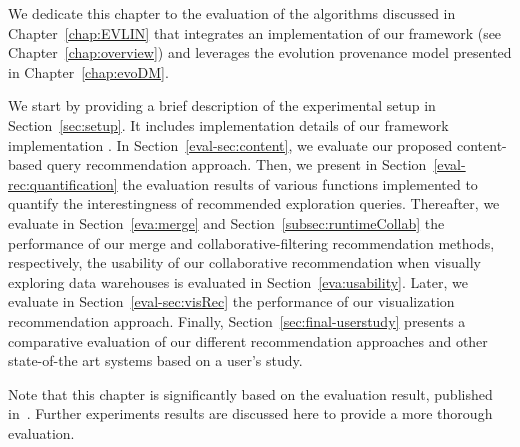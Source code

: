 We dedicate this chapter to the evaluation of the algorithms discussed in Chapter~\ref{chap:EVLIN} that integrates an implementation of our framework (see Chapter~\ref{chap:overview}) and leverages the evolution provenance model presented in Chapter~\ref{chap:evoDM}.


We start by providing a brief description of the experimental setup in Section~\ref{sec:setup}. 
It includes implementation details of our framework implementation \prototype{}.
In Section~\ref{eval-sec:content}, we evaluate our proposed content-based query recommendation approach. Then, we present in Section~\ref{eval-rec:quantification} the evaluation results of various functions implemented to quantify the interestingness of recommended exploration queries. 
Thereafter, we evaluate in Section~\ref{eva:merge} and Section~\ref{subsec:runtimeCollab} the performance of our merge and collaborative-filtering recommendation methods, respectively, the usability of our collaborative recommendation when visually exploring data warehouses  is evaluated in Section~\ref{eva:usability}.
Later, we evaluate in Section~\ref{eval-sec:visRec} the performance of our visualization recommendation approach.
Finally, Section~\ref{sec:final-userstudy} presents a comparative evaluation of our different recommendation approaches and other state-of-the art systems based on a user's study.


Note that this chapter is significantly based on the evaluation result, published in~\cite{Houssem:17:tapp,Houssem:19:adbis,Houssem:19:IS}. Further experiments results are discussed here to provide a more thorough evaluation.


